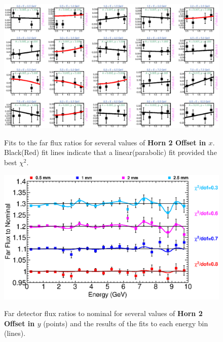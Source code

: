 {\begin{figure}[ht]
  \begin{center}
    {\includegraphics[width=5.0in]{figures/Horn2XOffset_far_fits.eps}}
  \end{center}
\caption{ Fits to the far flux ratios for several values of {\bf Horn 2 Offset in $x$}. Black(Red) fit lines indicate that a linear(parabolic) fit provided the best $\chi^2$. }
\end{figure}

\begin{figure}[ht]
  \begin{center}
    {\includegraphics[width=6.0in]{figures/Horn2YOffset_far_summary.eps}}
  \end{center}
\caption{ Far detector flux ratios to nominal for several values of {\bf Horn 2 Offset in $y$} (points) and the results of the fits to each energy bin (lines).}
\end{figure}

}
